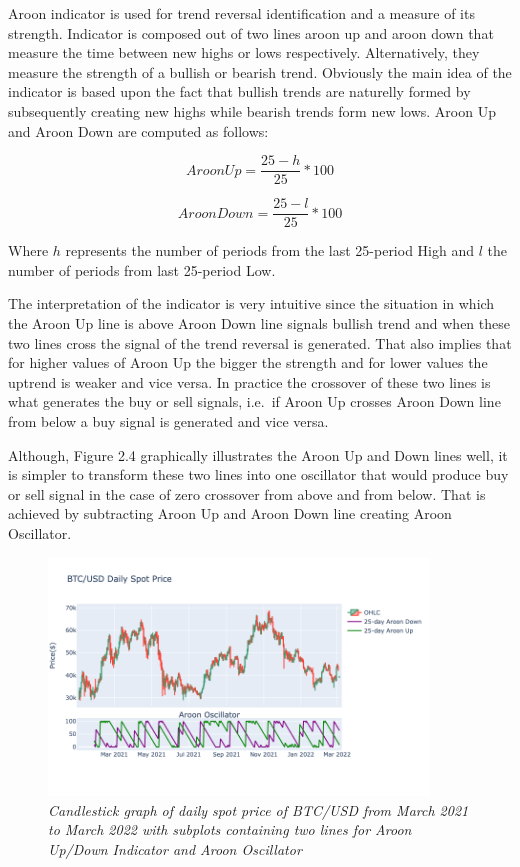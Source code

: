 Aroon indicator is used for trend reversal identification and a measure of its strength. Indicator is composed out of two lines aroon up and aroon down that measure the time between new highs or lows respectively. Alternatively, they measure the strength of a bullish or bearish trend. Obviously the main idea of the indicator is based upon the fact that bullish trends are naturelly formed by subsequently creating new highs while bearish trends form new lows. Aroon Up and Aroon Down are computed as follows:

\begin{equation}
Aroon Up = \frac{25 - h}{25} * 100
\end{equation}
 
\begin{equation}
Aroon Down = \frac{25 - l}{25} * 100
\end{equation}

Where $h$ represents the number of periods from the last 25-period High and $l$ the number of periods from last 25-period Low. 

The interpretation of the indicator is very intuitive since the situation in which the Aroon Up line is above Aroon Down line signals bullish trend and when these two lines cross the signal of the trend reversal is generated. That also implies that for higher values of Aroon Up the bigger the strength and for lower values the uptrend is weaker and vice versa. In practice the crossover of these two lines is what generates the buy or sell signals, i.e.\ if Aroon Up crosses Aroon Down line from below a buy signal is generated and vice versa. 

Although, Figure 2.4 graphically illustrates the Aroon Up and Down lines well, it is simpler to transform these two lines into one oscillator that would produce buy or sell signal in the case of zero crossover from above and from below. That is achieved by subtracting Aroon Up and Aroon Down line creating Aroon Oscillator.

\begin{figure}[ht]
\begin{center}
	\includegraphics[width=0.9\textwidth]{Figs/Aroon.png}
\end{center}
\caption{\textit{Candlestick graph of daily spot price of BTC/USD from March 2021 to March 2022 with subplots containing two lines for Aroon Up/Down Indicator and Aroon Oscillator}}
\end{figure}


